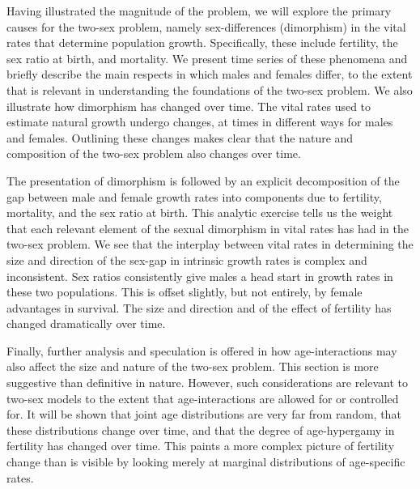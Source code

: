 Having illustrated the magnitude of the problem, we will explore the primary
causes for the two-sex problem, namely sex-differences (dimorphism) in the vital rates
that determine population growth. Specifically, these include fertility, the sex
ratio at birth, and mortality. We present time series of these phenomena and
briefly describe the main respects in which males and females differ, to the
extent that is relevant in understanding the foundations of the two-sex problem.
We also illustrate how dimorphism has changed over time. The vital rates
used to estimate natural growth undergo changes, at times in different ways for
males and females. Outlining these changes makes clear that the nature and
composition of the two-sex problem also changes over time.

The presentation of dimorphism is followed by an explicit decomposition of the
gap between male and female growth rates into components due to fertility,
mortality, and the sex ratio at birth. This analytic exercise tells us the
weight that each relevant element of the sexual dimorphism in vital rates has
had in the two-sex problem. We see that the interplay between vital rates
in determining the size and direction of the sex-gap in intrinsic growth rates
is complex and inconsistent. Sex ratios consistently give males a head start in
growth rates in these two populations. This is offset slightly, but not
entirely, by female advantages in survival. The size and direction and of the effect of
fertility has changed dramatically over time.

Finally, further analysis and speculation is offered in how age-interactions may
also affect the size and nature of the two-sex problem. This section is more
suggestive than definitive in nature. However, such considerations are relevant
to two-sex models to the extent that age-interactions are allowed for or
controlled for. It will be shown that joint age distributions are very far
from random, that these distributions change over time, and that the degree of
age-hypergamy in fertility has changed over time. This paints a more complex
picture of fertility change than is visible by looking merely at marginal
distributions of age-specific rates.









